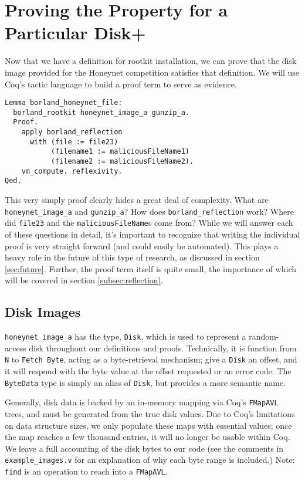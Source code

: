 \documentclass[nocopyrightspace]{sigplanconf}
\begin{document}
\section{Proving the Property for a Particular Disk+}
\label{sec:proving}

Now that we have a definition for rootkit installation, we can prove that the
disk image provided for the Honeynet competition satisfies that definition. We
will use Coq's tactic language to build a proof term to serve as evidence.

\begin{lstlisting}
Lemma borland_honeynet_file:
  borland_rootkit honeynet_image_a gunzip_a.
  Proof.
    apply borland_reflection 
      with (file := file23) 
           (filename1 := maliciousFileName1) 
           (filename2 := maliciousFileName2).
    vm_compute. reflexivity.
Qed.
\end{lstlisting}

This very simply proof clearly hides a great deal of complexity. What are {\tt
honeynet\_image\_a} and {\tt gunzip\_a}? How does {\tt borland\_reflection}
work? Where did {\tt file23} and the {\tt maliciousFileName}s come from? While
we will answer each of these questions in detail, it's important to recognize
that writing the individual proof is very straight forward (and could easily
be automated). This plays a heavy role in the future of this type of research,
as discussed in section \ref{sec:future}. Further, the proof term itself is
quite small, the importance of which will be covered in section
\ref{subsec:reflection}.

\subsection{Disk Images}

{\tt honeynet\_image\_a} has the type, {\tt Disk}, which is used to represent
a random-access disk throughout our definitions and proofs.  Technically, it
is function from {\tt N} to {\tt Fetch Byte}, acting as a byte-retrieval
mechanism; give a {\tt Disk} an offset, and it will respond with the byte
value at the offset requested or an error code. The {\tt ByteData} type is
simply an alias of {\tt Disk}, but provides a more semantic name.

Generally, disk data is backed by an in-memory mapping via Coq's {\tt FMapAVL}
trees, and must be generated from the true disk values. Due to Coq's
limitations on data structure sizes, we only populate these maps with
essential values; once the map reaches a few thousand entries, it will no
longer be usable within Coq. We leave a full accounting of the disk bytes to
our code (see the comments in {\tt example\_images.v} for an explanation of
why each byte range is included.) Note: {\tt find} is an operation to reach
into a {\tt FMapAVL}.
\end{document}
